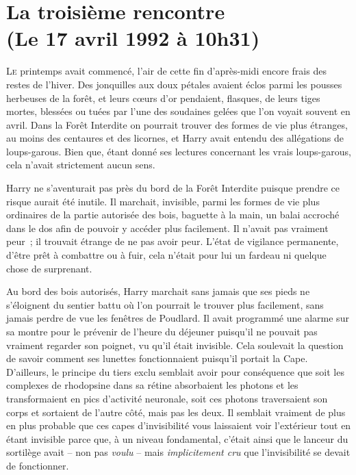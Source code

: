 
\section{La troisième rencontre\\
(Le 17 avril 1992 à 10h31)}

\lettrine{L}{e} printemps avait commencé, l'air de cette fin d'après-midi encore frais des restes de l'hiver.
Des jonquilles aux doux pétales avaient éclos parmi les pousses herbeuses de la forêt, et leurs cœurs d'or pendaient, flasques, de leurs tiges mortes, blessées ou tuées par l'une des soudaines gelées que l'on voyait souvent en avril.
Dans la Forêt Interdite on pourrait trouver des formes de vie plus étranges, au moins des centaures et des licornes, et Harry avait entendu des allégations de loups-garous.
Bien que, étant donné ses lectures concernant les vrais loups-garous, cela n'avait strictement aucun sens.

Harry ne s'aventurait pas près du bord de la Forêt Interdite puisque prendre ce risque aurait été inutile.
Il marchait, invisible, parmi les formes de vie plus ordinaires de la partie autorisée des bois, baguette à la main, un balai accroché dans le dos afin de pouvoir y accéder plus facilement.
Il n'avait pas vraiment peur~; il trouvait étrange de ne pas avoir peur.
L'état de vigilance permanente, d'être prêt à combattre ou à fuir, cela n'était pour lui un fardeau ni quelque chose de surprenant.

Au bord des bois autorisés, Harry marchait sans jamais que ses pieds ne s'éloignent du sentier battu où l'on pourrait le trouver plus facilement, sans jamais perdre de vue les fenêtres de Poudlard.
Il avait programmé une alarme sur sa montre pour le prévenir de l'heure du déjeuner puisqu'il ne pouvait pas vraiment regarder son poignet, vu qu'il était invisible.
Cela soulevait la question de savoir comment ses lunettes fonctionnaient puisqu'il portait la Cape.
D'ailleurs, le principe du tiers exclu semblait avoir pour conséquence que soit les complexes de rhodopsine dans sa rétine absorbaient les photons et les transformaient en pics d'activité neuronale, soit ces photons traversaient son corps et sortaient de l'autre côté, mais pas les deux.
Il semblait vraiment de plus en plus probable que ces capes d'invisibilité vous laissaient voir l'extérieur tout en étant invisible parce que, à un niveau fondamental, c'était ainsi que le lanceur du sortilège avait -- non pas \emph{voulu} -- mais \emph{implicitement cru} que l'invisibilité se devait de fonctionner.

